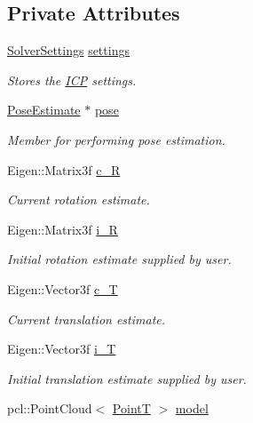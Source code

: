 \subsection*{\-Private \-Attributes}
\begin{DoxyCompactItemize}
\item 
\hyperlink{structSolverSettings}{\-Solver\-Settings} \hyperlink{classICP_a7e3065919f63c9bdc0ff0677b5cf56d0}{settings}
\begin{DoxyCompactList}\small\item\em \-Stores the \hyperlink{classICP}{\-I\-C\-P} settings. \end{DoxyCompactList}\item 
\hyperlink{classPoseEstimate}{\-Pose\-Estimate} $\ast$ \hyperlink{classICP_a09c458b7e1daa98c6cc98177003794ce}{pose}
\begin{DoxyCompactList}\small\item\em \-Member for performing pose estimation. \end{DoxyCompactList}\item 
\-Eigen\-::\-Matrix3f \hyperlink{classICP_aee085ec283f657cb3980c529d48ba65b}{c\-\_\-\-R}
\begin{DoxyCompactList}\small\item\em \-Current rotation estimate. \end{DoxyCompactList}\item 
\-Eigen\-::\-Matrix3f \hyperlink{classICP_a07164ef6066cf0c9537881871cd56601}{i\-\_\-\-R}
\begin{DoxyCompactList}\small\item\em \-Initial rotation estimate supplied by user. \end{DoxyCompactList}\item 
\-Eigen\-::\-Vector3f \hyperlink{classICP_a55de298290d8e74617fdf19c153d55be}{c\-\_\-\-T}
\begin{DoxyCompactList}\small\item\em \-Current translation estimate. \end{DoxyCompactList}\item 
\-Eigen\-::\-Vector3f \hyperlink{classICP_a63b486fc85453b0f09c6020e1c6227f4}{i\-\_\-\-T}
\begin{DoxyCompactList}\small\item\em \-Initial translation estimate supplied by user. \end{DoxyCompactList}\item 
pcl\-::\-Point\-Cloud$<$ \hyperlink{common_8h_abd10555a534258e2739a38c928ef5db1}{\-Point\-T} $>$ \hyperlink{classICP_ae224713dd84e34bbef52a011046527af}{model}

\end{DoxyCompactItemize}
